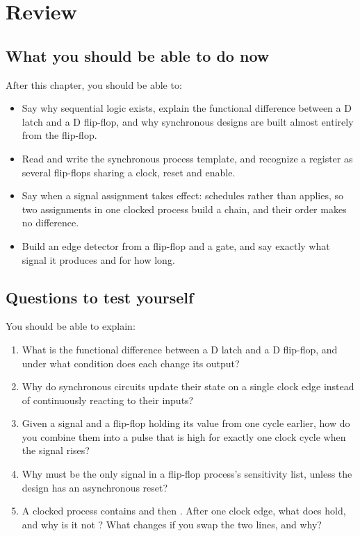 
\section{Review}
\label{c3:sec:review}

\subsection*{What you should be able to do now}
After this chapter, you should be able to:
\begin{itemize}
  \item Say why sequential logic exists, explain the functional difference between a D latch and a
    D flip-flop, and why synchronous designs are built almost entirely from the flip-flop.
  \item Read and write the synchronous process template, and recognize a register as several
    flip-flops sharing a clock, reset and enable.
  \item Say when a signal assignment takes effect: \code{<=} schedules rather than applies, so two
    assignments in one clocked process build a chain, and their order makes no difference.
  \item Build an edge detector from a flip-flop and a gate, and say exactly what signal it produces
    and for how long.
\end{itemize}

\subsection*{Questions to test yourself}
You should be able to explain:
\begin{enumerate}
  \item What is the functional difference between a D latch and a D flip-flop, and under what
    condition does each change its output?
  \item Why do synchronous circuits update their state on a single clock edge instead of
    continuously reacting to their inputs?
  \item Given a signal and a flip-flop holding its value from one cycle earlier, how do you combine
    them into a pulse that is high for exactly one clock cycle when the signal rises?
  \item Why must  be the only signal in a flip-flop process's sensitivity list, unless
    the design has an asynchronous reset?
  \item A clocked process contains  and then . After one clock edge, what
    does  hold, and why is it not ? What changes if you swap the two lines, and why?
\end{enumerate}

